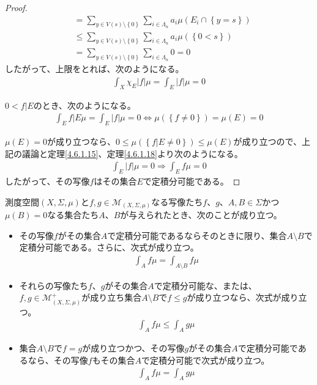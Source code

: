 \documentclass[dvipdfmx]{jsarticle}
\begin{document}
\begin{proof}
\begin{align*}
&= \sum_{y \in V(s) \setminus \left\{ 0 \right\}} {\sum_{i \in \varLambda_{n}} {a_{i}\mu\left( E_{i} \cap \left\{ y = s \right\} \right)}}\\
&\leq \sum_{y \in V(s) \setminus \left\{ 0 \right\}} {\sum_{i \in \varLambda_{n}} {a_{i}\mu\left( \left\{ 0 < s \right\} \right)}}\\
&= \sum_{y \in V(s) \setminus \left\{ 0 \right\}} {\sum_{i \in \varLambda_{n}} 0} = 0
\end{align*}
したがって、上限をとれば、次のようになる。
\begin{align*}
\int_{X} {\chi_{E}|f|\mu} = \int_{E} {|f|\mu} = 0
\end{align*}\par
$0 < f|E$のとき、次のようになる。
\begin{align*}
\int_{E} {f|E\mu} = \int_{E} {|f|\mu} = 0 \Leftrightarrow \mu\left( \left\{ f \neq 0 \right\} \right) = \mu(E) = 0
\end{align*}\par
$\mu(E) = 0$が成り立つなら、$0 \leq \mu\left( \left\{ f|E \neq 0 \right\} \right) \leq \mu(E)$が成り立つので、上記の議論と定理\ref{4.6.1.15}、定理\ref{4.6.1.18}より次のようになる。
\begin{align*}
\int_{E} {|f|\mu} = 0 \Rightarrow \int_{E} {f\mu} = 0
\end{align*}
したがって、その写像$f$はその集合$E$で定積分可能である。
\end{proof}
\begin{thm}\label{4.6.1.21}
測度空間$(X,\varSigma,\mu)$と$f,g \in \mathcal{M}_{(X,\varSigma,\mu)}$なる写像たち$f$、$g$、$A,B \in \varSigma$かつ$\mu(B) = 0$なる集合たち$A$、$B$が与えられたとき、次のことが成り立つ。
\begin{itemize}
\item
  その写像$f$がその集合$A$で定積分可能であるならそのときに限り、集合$A \setminus B$で定積分可能である。さらに、次式が成り立つ。
\begin{align*}
\int_{A} {f\mu} = \int_{A \setminus B} {f\mu}
\end{align*}
\item
  それらの写像たち$f$、$g$がその集合$A$で定積分可能な、または、$f,g \in \mathcal{M}_{(X,\varSigma,\mu)}^{+}$が成り立ち集合$A \setminus B$で$f \leq g$が成り立つなら、次式が成り立つ。
\begin{align*}
\int_{A} {f\mu} \leq \int_{A} {g\mu}
\end{align*}
\item
  集合$A \setminus B$で$f = g$が成り立つかつ、その写像$g$がその集合$A$で定積分可能であるなら、その写像$f$もその集合$A$で定積分可能で次式が成り立つ。
\begin{align*}
\int_{A} {f\mu} = \int_{A} {g\mu}
\end{align*}
\end{itemize}
\end{thm}
\end{document}

